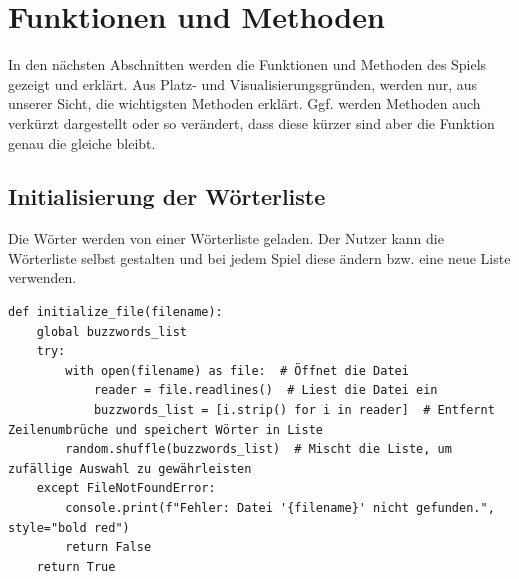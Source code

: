 \documentclass{llncs}
\begin{document}
\section{Funktionen und Methoden}

In den nächsten Abschnitten werden die Funktionen und Methoden des Spiels gezeigt und erklärt. Aus Platz- und Visualisierungsgründen, werden nur, aus unserer Sicht, die wichtigsten Methoden erklärt. Ggf. werden Methoden auch verkürzt dargestellt oder so verändert, dass diese kürzer sind aber die Funktion genau die gleiche bleibt.

\subsection{Initialisierung der Wörterliste}

Die Wörter werden von einer Wörterliste geladen. Der Nutzer kann die Wörterliste selbst gestalten und bei jedem Spiel diese ändern bzw. eine neue Liste verwenden.

\begin{lstlisting}[caption=Laden der Wörterliste]
def initialize_file(filename): 
    global buzzwords_list
    try:
        with open(filename) as file:  # Öffnet die Datei
            reader = file.readlines()  # Liest die Datei ein
            buzzwords_list = [i.strip() for i in reader]  # Entfernt Zeilenumbrüche und speichert Wörter in Liste
        random.shuffle(buzzwords_list)  # Mischt die Liste, um zufällige Auswahl zu gewährleisten
    except FileNotFoundError:
        console.print(f"Fehler: Datei '{filename}' nicht gefunden.", style="bold red")
        return False
    return True
\end{lstlisting}
\end{document}
